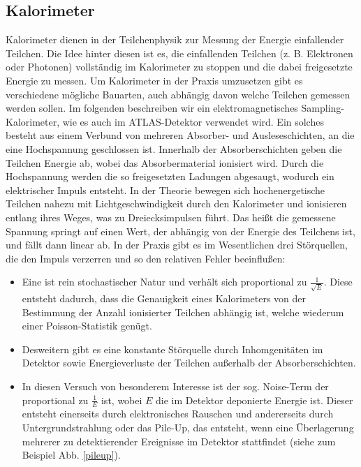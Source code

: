 \subsection{Kalorimeter}
Kalorimeter dienen in der Teilchenphysik zur Messung der Energie einfallender Teilchen.
Die Idee hinter diesen ist es, die einfallenden Teilchen (z. B. Elektronen oder Photonen) vollständig im Kalorimeter zu stoppen und die dabei freigesetzte Energie zu messen.
Um Kalorimeter in der Praxis umzusetzen gibt es verschiedene mögliche Bauarten, auch abhängig davon welche Teilchen gemessen werden sollen.
Im folgenden beschreiben wir ein elektromagnetisches Sampling-Kalorimeter, wie es auch im ATLAS-Detektor verwendet wird.
Ein solches besteht aus einem Verbund von mehreren Absorber- und Ausleseschichten, an die eine Hochspannung geschlossen ist.
Innerhalb der Absorberschichten geben die Teilchen Energie ab, wobei das Absorbermaterial ionisiert wird.
Durch die Hochspannung werden die so freigesetzten Ladungen abgesaugt, wodurch ein elektrischer Impuls entsteht.
In der Theorie bewegen sich hochenergetische Teilchen nahezu mit Lichtgeschwindigkeit durch den Kalorimeter und ionisieren entlang ihres Weges, was zu Dreiecksimpulsen führt.
Das heißt die gemessene Spannung springt auf einen Wert, der abhängig von der Energie des Teilchens ist, und fällt dann linear ab.
In der Praxis gibt es im Wesentlichen drei Störquellen, die den Impuls verzerren und so den relativen Fehler beeinflußen:
\begin{itemize}
\item Eine ist rein stochastischer Natur und verhält sich proportional zu $\frac{1}{\sqrt{E}}$.
Diese entsteht dadurch, dass die Genauigkeit eines Kalorimeters von der Bestimmung der Anzahl ionisierter Teilchen abhängig ist, welche wiederum einer Poisson-Statistik genügt.

\item Desweitern gibt es eine konstante Störquelle durch Inhomgenitäten im Detektor sowie Energieverluste der Teilchen außerhalb der Absorberschichten.

\item In diesen Versuch von besonderem Interesse ist der sog. \glqq Noise-Term\grqq{} der proportional zu $\frac{1}{E}$ ist, wobei $E$ die im Detektor deponierte Energie ist.
Dieser entsteht einerseits durch elektronisches Rauschen und andererseits durch Untergrundstrahlung oder das Pile-Up, das entsteht, wenn eine Überlagerung mehrerer zu detektierender Ereignisse im Detektor stattfindet (siehe zum Beispiel Abb. \ref{pileup}).
\end{itemize}

